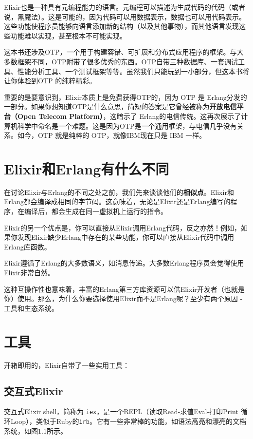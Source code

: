 Elixir也是一种具有元编程能力的语言。元编程可以描述为生成代码的代码（或者说，黑魔法）。这是可能的，因为代码可以用数据表示，数据也可以用代码表示。这些功能使程序员能够向语言添加新的结构（以及其他事物），而其他语言发现这些功能难以实现，甚至根本不可能实现。

这本书还涉及OTP，一个用于构建容错、可扩展和分布式应用程序的框架。与大多数框架不同，OTP附带了很多优秀的东西。OTP自带三种数据库、一套调试工具、性能分析工具、一个测试框架等等。虽然我们只能玩到一小部分，但这本书将让你体验到OTP 的纯粹精彩。

重要的是要意识到，Elixir本质上是免费获得OTP的，因为 OTP 是 Erlang分发的一部分。如果你想知道OTP是什么意思，简短的答案是它曾经被称为\textbf{开放电信平台（Open Telecom Platform）}，这暗示了 Erlang的电信传统。这再次展示了计算机科学中命名是一个难题。这是因为OTP是一个通用框架，与电信几乎没有关系。如今，OTP 就是纯粹的 OTP，就像IBM现在只是 IBM 一样。

\section{Elixir和Erlang有什么不同}

在讨论Elixir与Erlang的不同之处之前，我们先来谈谈他们的\textbf{相似点}。Elixir和Erlang都会编译成相同的字节码。这意味着，无论是Elixir还是Erlang编写的程序，在编译后，都会生成在同一虚拟机上运行的指令。

Elixir的另一个优点是，你可以直接从Elixir调用Erlang代码，反之亦然！例如，如果你发现Elixir缺少Erlang中存在的某些功能，你可以直接从Elixir代码中调用Erlang库函数。

Elixir遵循了Erlang的大多数语义，如消息传递。大多数Erlang程序员会觉得使用Elixir非常自然。

这种互操作性也意味着，丰富的Erlang第三方库资源可以供Elixir开发者（也就是你）使用。那么，为什么你要选择使用Elixir而不是Erlang呢？至少有两个原因 - 工具和生态系统。

\section{工具}

开箱即用的，Elixir自带了一些实用工具：

\subsection{交互式Elixir}

交互式Elixir shell，简称为 \texttt{iex}，是一个REPL（读取Read-求值Eval-打印Print 循环Loop），类似于Ruby的\texttt{irb}。它有一些非常棒的功能，如语法高亮和漂亮的文档系统，如图1.1所示。


